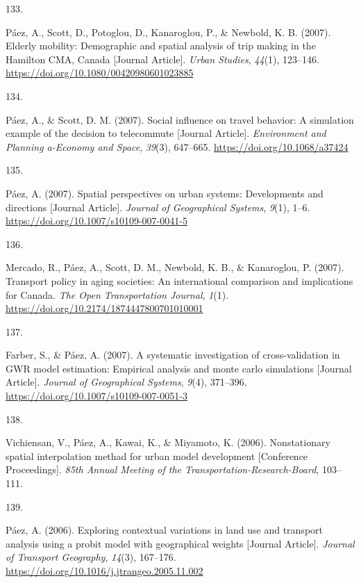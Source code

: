 \documentclass[11pt,a4paper,]{awesome-cv}
\newlength{\cslhangindent}
\newlength{\csllabelwidth}
\newenvironment{CSLReferences}[2] %
 {\begin{list}{}{%
  \setlength{\itemindent}{0pt}
  \setlength{\leftmargin}{0pt}
  \setlength{\parsep}{0pt}
  \ifodd #1
   \setlength{\leftmargin}{\cslhangindent}
   \setlength{\itemindent}{-1\cslhangindent}
  \fi
  \setlength{\itemsep}{#2\baselineskip}}}
 {\end{list}}
\newcommand{\CSLLeftMargin}[1]{\parbox[t]{\csllabelwidth}{\strut#1\strut}}
\newcommand{\CSLRightInline}[1]{\parbox[t]{\linewidth - \csllabelwidth}{\strut#1\strut}}
\begin{document}
\begin{CSLReferences}{0}{0}
\CSLLeftMargin{133. }%
\CSLRightInline{Páez, A., Scott, D., Potoglou, D., Kanaroglou, P., \&
Newbold, K. B. (2007). Elderly mobility: Demographic and spatial
analysis of trip making in the Hamilton CMA, Canada {[}Journal
Article{]}. \emph{Urban Studies}, \emph{44}(1), 123--146.
\url{https://doi.org/10.1080/00420980601023885}}

\CSLLeftMargin{134. }%
\CSLRightInline{Páez, A., \& Scott, D. M. (2007). Social influence on
travel behavior: A simulation example of the decision to telecommute
{[}Journal Article{]}. \emph{Environment and Planning a-Economy and
Space}, \emph{39}(3), 647--665. \url{https://doi.org/10.1068/a37424}}

\CSLLeftMargin{135. }%
\CSLRightInline{Páez, A. (2007). Spatial perspectives on urban systems:
Developments and directions {[}Journal Article{]}. \emph{Journal of
Geographical Systems}, \emph{9}(1), 1--6.
\url{https://doi.org/10.1007/s10109-007-0041-5}}

\CSLLeftMargin{136. }%
\CSLRightInline{Mercado, R., Páez, A., Scott, D. M., Newbold, K. B., \&
Kanaroglou, P. (2007). Transport policy in aging societies: An
international comparison and implications for Canada. \emph{The Open
Transportation Journal}, \emph{1}(1).
\url{https://doi.org/10.2174/1874447800701010001}}

\CSLLeftMargin{137. }%
\CSLRightInline{Farber, S., \& Páez, A. (2007). A systematic
investigation of cross-validation in GWR model estimation: Empirical
analysis and monte carlo simulations {[}Journal Article{]}.
\emph{Journal of Geographical Systems}, \emph{9}(4), 371--396.
\url{https://doi.org/10.1007/s10109-007-0051-3}}

\CSLLeftMargin{138. }%
\CSLRightInline{Vichiensan, V., Páez, A., Kawai, K., \& Miyamoto, K.
(2006). Nonstationary spatial interpolation methad for urban model
development {[}Conference Proceedings{]}. \emph{85th Annual Meeting of
the Transportation-Research-Board}, 103--111.}

\CSLLeftMargin{139. }%
\CSLRightInline{Páez, A. (2006). Exploring contextual variations in land
use and transport analysis using a probit model with geographical
weights {[}Journal Article{]}. \emph{Journal of Transport Geography},
\emph{14}(3), 167--176.
\url{https://doi.org/10.1016/j.jtrangeo.2005.11.002}}


\end{CSLReferences}
\end{document}
